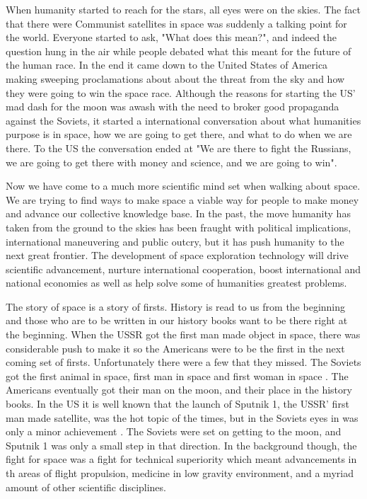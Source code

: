 \documentclass[a4paper,12pt]{article}
\title{}
\author{John Curry\\
        C0409094\\
        History 108\\
        Camosun College\\
        }
\date{\today}
\begin{document}
\maketitle

When humanity started to reach for the stars, all eyes were on the skies. The fact that there were Communist satellites in space was suddenly a talking point for the world. Everyone started to ask, "What does this mean?", and indeed the question hung in the air while people debated what this meant for the future of the human race. In the end it came down to the United States of America making sweeping proclamations about about the threat from the sky and how they were going to win the space race. Although the reasons for starting the US' mad dash for the moon was awash with the need to broker good propaganda against the Soviets, it started a international conversation about what humanities purpose is in space, how we are going to get there, and what to do when we are there. To the US the conversation ended at "We are there to fight the Russians, we are going to get there with money and science, and we are going to win". 

Now we have come to a much more scientific mind set when walking about space. We are trying to find ways to make space a viable way for people to make money and advance our collective knowledge base. In the past, the move humanity has taken from the ground to the skies has been fraught with political implications, international maneuvering and public outcry, but it has push humanity to the next great frontier. The development of space exploration technology will drive scientific advancement, nurture international cooperation, boost international and national economies as well as help solve some of humanities greatest problems. 

The story of space is a story of firsts. History is read to us from the beginning and those who are to be written in our history books want to be there right at the beginning. When the USSR got the first man made object in space, there was considerable push to make it so the Americans were to be the first in the next coming set of firsts. Unfortunately there were a few that they missed. The Soviets got the first animal in space, first man in space and first woman in space \autocite{west2001}. The Americans eventually got their man on the moon, and their place in the history books. In the US it is well known that the launch of Sputnik 1, the USSR' first man made satellite, was the hot topic of the times, but in the Soviets eyes in was only a minor achievement \autocite{west2001}. The Soviets were set on getting to the moon, and Sputnik 1 was only a small step in that direction. In the background though, the fight for space was a fight for technical superiority which meant advancements in th areas of flight propulsion, medicine in low gravity environment, and a myriad amount of other scientific disciplines. 
\end{document}
